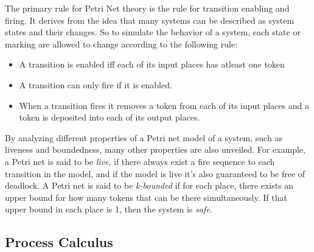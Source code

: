 The primary rule for Petri Net theory is the rule for transition enabling and firing. It derives from the idea that many systems can be described as system states and their changes. So to simulate the behavior of a system, each state or marking are allowed to change according to the following rule:

\begin{itemize}
	\item A transition is enabled iff each of its input places has atleast one token
	\item A transition can only fire if it is enabled.
	\item When a transition fires it removes a token from each of its input places and a token is deposited into each of its output places.
\end{itemize}


By analyzing different properties of a Petri net model of a system, such as liveness and boundedness, many other properties are also unveiled. For example, a Petri net is said to be \textit{live}, if there always exist a fire sequence to each transition in the model, and if the model is live it's also guaranteed to be free of deadlock\cite{ramamoorthy1980performance}. A Petri net is said to be \textit{k-bounded} if for each place, there exists an upper bound for how many tokens that can be there simultaneously. If that upper bound in each place is 1, then the system is \textit{safe}. %



\subsection{Process Calculus}

